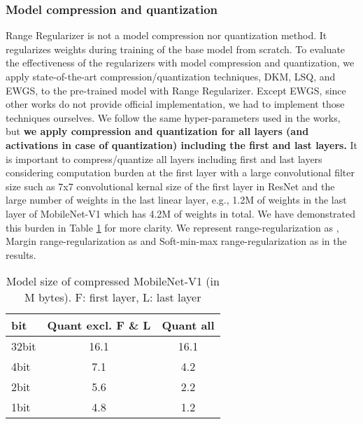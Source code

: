\documentclass[10pt,twocolumn,letterpaper]{article}
\begin{document}
\subsubsection{Model compression and quantization}
Range Regularizer is not a model compression nor quantization method. It regularizes weights during training of the base model from scratch. To evaluate the effectiveness of the regularizers with model compression and quantization, we apply state-of-the-art compression/quantization techniques, DKM\cite{cho2021dkm}, LSQ\cite{esser2019learned}, and EWGS\cite{lee2021network}, to the pre-trained model with Range Regularizer. 
Except EWGS, since other works do not provide official implementation, we had to implement those techniques ourselves. We follow the same hyper-parameters used in the works, but \textbf{we apply compression and quantization for all layers (and activations in case of quantization) including the first and last layers.} It is important to compress/quantize all layers including first and last layers considering computation burden at the first layer with a large convolutional filter size such as 7x7 convolutional kernal size of the first layer in ResNet and the large number of weights in the last linear layer, e.g., 1.2M of weights in the last layer of MobileNet-V1 which has 4.2M of weights in total. We have demonstrated this burden in Table \ref{table_model_size} for more clarity. We represent  range-regularization as , Margin range-regularization as  and Soft-min-max range-regularization as  in the results.
\begin{table}[t]
\caption{Model size of compressed MobileNet-V1 (in M bytes). F: first layer, L: last layer} \label{table_model_size}
\vskip 0.15in
\begin{center}
\begin{small}
\begin{sc}



\begin{tabular}{lcc}
\toprule
bit & Quant excl. F \& L & Quant all \\
\midrule
32bit & 16.1   & 16.1 \\
\midrule
4bit & 7.1   & 4.2 \\
2bit & 5.6   & 2.2 \\
1bit & 4.8   & 1.2 \\
\bottomrule
\end{tabular}
\end{sc}
\end{small}
\end{center}
\vskip -0.1in
\end{table}
\end{document}
